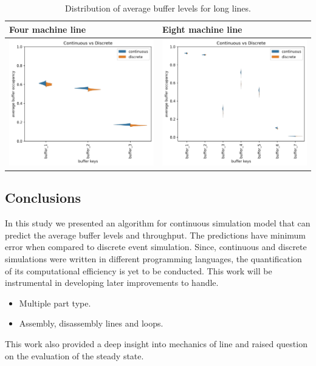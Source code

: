 \begin{table}[htbp]
    \centering
    \begin{tabular}{|p{7cm}|p{7cm}|}
        \hline
        Four machine line & 
        Eight machine line \\
        \hline  
        \parbox[c]{7cm}{\centering \includegraphics[width = 
        7cm]{figures/transfer_4_37_buffer_level_violin.png}} &
        \parbox[c]{7cm}{\centering \includegraphics[width = 7cm]{figures/transfer_8_36_buffer_level_violin.png}} \\
        \hline
    \end{tabular}
    \caption{Distribution of average buffer levels for long lines.}
    \label{tab:comparison}
\end{table} 

\subsection{Conclusions}
In this study we presented an algorithm for continuous simulation model that can predict the average buffer levels and throughput. The predictions have minimum error when compared to discrete event simulation. Since, continuous and discrete simulations were written in different programming languages, the quantification of its computational efficiency is yet to be conducted. This work will be instrumental in developing later improvements to handle.\par
\begin{itemize}
    \item Multiple part type.
    \item Assembly, disassembly lines and loops.
\end{itemize} 
This work also provided a deep insight into mechanics of line and raised question on the evaluation of the steady state. 